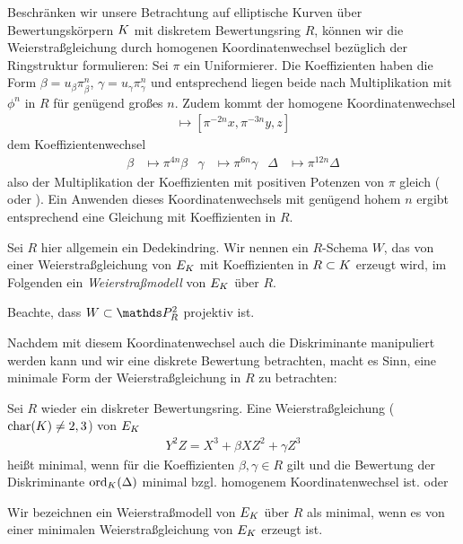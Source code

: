 \documentclass[german]{scrreprt}
\begin{document}
Beschränken wir unsere Betrachtung auf elliptische Kurven über
Bewertungskörpern $K$ mit diskretem Bewertungsring $R$, können wir
die Weierstraßgleichung durch homogenen Koordinatenwechsel bezüglich
der Ringstruktur formulieren:
Sei $\pi$ ein Uniformierer.
Die Koeffizienten haben die Form $\beta=u_\beta\pi^n_\beta$, $\gamma=u_\gamma\pi^n_\gamma$ und
entsprechend liegen beide nach Multiplikation mit $\phi^n$ in $R$ für
genügend großes $n$. Zudem kommt der homogene Koordinatenwechsel
\begin{gather*}
  [x,y,z] \longmapsto [\pi^{-2n}x, \pi^{-3n}y, z]
\end{gather*}
dem Koeffizientenwechsel
\begin{align*}
  \beta&\mapsto \pi^{4n}\beta
  &\gamma&\mapsto \pi^{6n}\gamma
  &\Delta&\mapsto \pi^{12n}\Delta
\end{align*}
also der Multiplikation der Koeffizienten mit positiven Potenzen von
$\pi$ gleich
(\cite[1.5, Lemma 2]{neron} oder \cite[Chapter VII.1]{silverman}).
Ein Anwenden dieses Koordinatenwechsels mit genügend hohem $n$ ergibt
entsprechend eine Gleichung mit Koeffizienten in $R$.

\begin{Definition}[Weierstraßmodell]
  Sei $R$ hier allgemein ein Dedekindring.
  Wir nennen ein $R$-Schema $W$, das von einer Weierstraßgleichung von
  $E_{K}$ mit Koeffizienten in $R\subset K$ erzeugt wird, im Folgenden
  ein \emph{Weierstraßmodell} von $E_{K}$ über $R$.

  Beachte, dass $W\subset\P_R^2$ projektiv ist.
\end{Definition}

Nachdem mit diesem Koordinatenwechsel auch die Diskriminante
manipuliert werden kann und wir eine diskrete Bewertung betrachten,
macht es Sinn, eine minimale Form der Weierstraßgleichung in $R$ zu
betrachten:
\begin{Definition}
  Sei $R$ wieder ein diskreter Bewertungsring.
  Eine Weierstraßgleichung ($\operatorname{char}(K)\neq2,3$) von $E_{K}$
  \begin{gather*}
    Y^2Z = X^3 + \beta XZ^2 + \gamma Z^3
  \end{gather*}
  heißt minimal, wenn für die Koeffizienten $\beta, \gamma\in R$ gilt
  und die Bewertung der Diskriminante $\operatorname{ord}_{K}(\Delta)$ minimal
  bzgl. homogenem Koordinatenwechsel ist.
  \cite[Chapter 1.5, S.\,22]{neron} oder
  \cite[Chapter VII.1]{silverman}

  Wir bezeichnen ein Weierstraßmodell von $E_{K}$ über $R$ als minimal,
  wenn es von einer minimalen Weierstraßgleichung von $E_{K}$ erzeugt
  ist.
\end{Definition}
\end{document}
